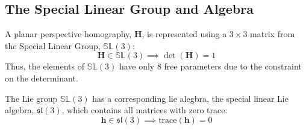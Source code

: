\subsection{The Special Linear Group and Algebra}

A planar perspective homography, \(\mathbf{H}\), is represented using a \(3\times 3\) matrix from the Special Linear Group, \(\mathbb{SL}(3)\):
\[
    \mathbf{H}\in\mathbb{SL}(3)\implies\det(\mathbf{H})=1
\]
Thus, the elements of \(\mathbb{SL}(3)\) have only \(8\) free parameters due to the constraint on the determinant.

The Lie group \(\mathbb{SL}(3)\) has a corresponding lie alegbra, the special linear Lie algebra, \(\mathfrak{sl}(3)\), which contains all matrices with zero trace:
\[
    \mathbf{h}\in\mathfrak{sl}(3)\implies\text{trace}(\mathbf{h})=0
\]

